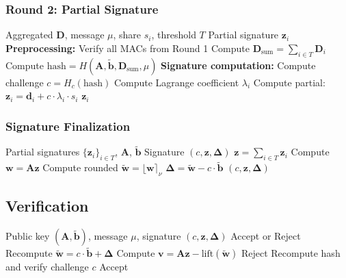 \documentclass[11pt,a4paper]{article}
\theoremstyle{definition}
\begin{document}
\subsubsection{Round 2: Partial Signature}

\begin{algorithm}
\caption{Ringtail Sign Round 2}
\begin{algorithmic}[1]
\Require Aggregated $\mathbf{D}$, message $\mu$, share $s_i$, threshold $T$
\Ensure Partial signature $\mathbf{z}_i$
\State \textbf{Preprocessing:}
\State Verify all MACs from Round 1
\State Compute $\mathbf{D}_{\text{sum}} = \sum_{i \in T} \mathbf{D}_i$
\State Compute $\text{hash} = H(\mathbf{A}, \tilde{\mathbf{b}}, \mathbf{D}_{\text{sum}}, \mu)$
\State \textbf{Signature computation:}
\State Compute challenge $c = H_c(\text{hash})$
\State Compute Lagrange coefficient $\lambda_i$
\State Compute partial: $\mathbf{z}_i = \mathbf{d}_i + c \cdot \lambda_i \cdot s_i$
\State \Return $\mathbf{z}_i$
\end{algorithmic}
\end{algorithm}

\subsubsection{Signature Finalization}

\begin{algorithm}
\caption{Ringtail Finalize Signature}
\begin{algorithmic}[1]
\Require Partial signatures $\{\mathbf{z}_i\}_{i \in T}$, $\mathbf{A}$, $\tilde{\mathbf{b}}$
\Ensure Signature $(c, \mathbf{z}, \boldsymbol{\Delta})$
\State $\mathbf{z} = \sum_{i \in T} \mathbf{z}_i$
\State Compute $\mathbf{w} = \mathbf{A}\mathbf{z}$
\State Compute rounded $\tilde{\mathbf{w}} = \lfloor \mathbf{w} \rceil_\nu$
\State $\boldsymbol{\Delta} = \tilde{\mathbf{w}} - c \cdot \tilde{\mathbf{b}}$
\State \Return $(c, \mathbf{z}, \boldsymbol{\Delta})$
\end{algorithmic}
\end{algorithm}

\subsection{Verification}

\begin{algorithm}
\caption{Ringtail Verify}
\begin{algorithmic}[1]
\Require Public key $(\mathbf{A}, \tilde{\mathbf{b}})$, message $\mu$, signature $(c, \mathbf{z}, \boldsymbol{\Delta})$
\Ensure Accept or Reject
\State Recompute $\tilde{\mathbf{w}} = c \cdot \tilde{\mathbf{b}} + \boldsymbol{\Delta}$
\State Compute $\mathbf{v} = \mathbf{A}\mathbf{z} - \text{lift}(\tilde{\mathbf{w}})$
    \State \Return Reject
\EndIf
\State Recompute hash and verify challenge $c$
\State \Return Accept
\end{algorithmic}
\end{algorithm}
\end{document}
